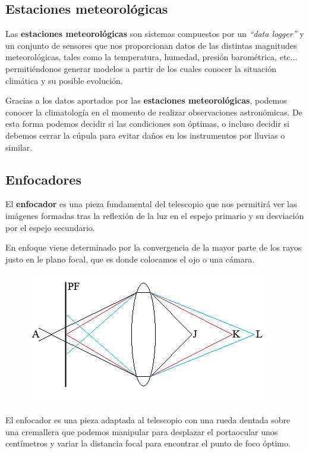 \subsection{Estaciones meteorológicas}

Las \textbf{estaciones meteorológicas} son sistemas compuestos por un \textit{``data logger''} y un conjunto de sensores que nos proporcionan datos de las distintas magnitudes meteorológicas, tales como la temperatura, humedad, presión barométrica, etc... permitiéndonos generar modelos a partir de los cuales conocer la situación climática y su posible evolución. 

\bigskip
Gracias a los datos aportados por las \textbf{estaciones meteorológicas}, podemos conocer la climatología en el momento de realizar observaciones astronómicas. De esta forma podemos decidir si las condiciones son óptimas, o incluso decidir si debemos cerrar la cúpula para evitar daños en los instrumentos por lluvias o similar. 



\subsection{Enfocadores}

El \textbf{enfocador} es una pieza fundamental del telescopio que nos permitirá ver las imágenes formadas tras la reflexión de la luz en el espejo primario y su desviación por el espejo secundario.

En enfoque viene determinado por la convergencia de la mayor parte de los rayos justo en le plano focal, que es donde colocamos el ojo o una cámara. 

\begin{figure}[h]
\centering
\includegraphics[width=0.7\linewidth]{../images/planofocal}
\caption{}
\label{fig:planofocal}
\end{figure}

\bigskip
El enfocador es una pieza adaptada al telescopio con una rueda dentada sobre una cremallera que podemos manipular para desplazar el portaocular unos centímetros y variar la distancia focal para encontrar el punto de foco óptimo.


